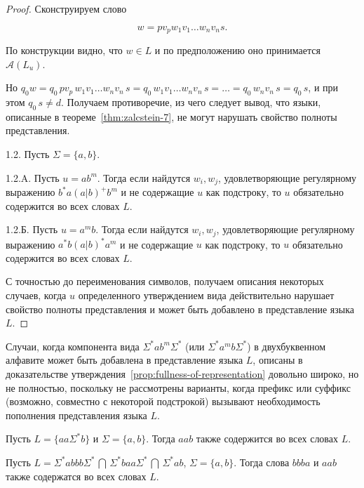 \documentclass[fontsize=14pt]{scrartcl}
\begin{document}
\begin{proof}
 Сконструируем слово 

 $$
 w = p v_p w_1 v_1 \ldots w_n v_n s.
 $$

 По конструкции видно, что $w \in L$ и по предположению оно принимается $\mathcal{A}(L_u)$.
 
 Но $q_0 w = q_0 \,p v_p \, w_1 v_1 \ldots w_n v_n\, s = q_0 \,w_1 v_1 \ldots w_n v_n\, s = \ldots  = q_0 \,w_n v_n \,s = q_0 \, s$,
и при этом $q_0\, s \neq d$. Получаем противоречие, из чего следует вывод, что языки, описанные в теореме~\ref{thm:zalcstein-7}, не могут 
нарушать свойство полноты представления.

1.2. Пусть $\Sigma = \{a, b\}$.

1.2.A. Пусть $u = a b^m$. Тогда если найдутся $w_i, w_j$, удовлетворяющие регулярному выражению
$b^*a(a|b)^+b^m$ и не содержащие $u$ как подстроку, то $u$ обязательно содержится во всех словах $L$.

1.2.Б. Пусть $u = a^m b$. Тогда если найдутся $w_i, w_j$, удовлетворяющие регулярному выражению
$a^*b(a|b)^*a^m$ и не содержащие $u$ как подстроку, то $u$ обязательно содержится во всех словах $L$.
 
С точностью до переименования символов, получаем описания некоторых случаев, когда $u$ определенного утверждением
вида действительно нарушает свойство полноты представления и может быть добавлено в представление языка $L$.

\end{proof}

Случаи, когда компонента вида $\Sigma^*a b^m \Sigma^*$ (или $\Sigma^*a^m b \Sigma^*$) в двухбуквенном алфавите
может быть добавлена в представление языка $L$, описаны в доказательстве утверждения~\ref{prop:fullness-of-representation} довольно
широко, но не полностью, поскольку не рассмотрены варианты, когда префикс или суффикс (возможно, совместно с некоторой подстрокой)
вызывают необходимость пополнения представления языка $L$.

\begin{Example}
Пусть $L = \{aa\Sigma^*b\}$ и $\Sigma = \{a, b\}$. Тогда $aab$ также содержится во всех словах $L$.
\end{Example}

\begin{Example}
Пусть $L = \Sigma^* abbb \Sigma^*\, \bigcap\, \Sigma^* baa \Sigma^*\, \bigcap\, \Sigma^* ab $, $\Sigma = \{a, b\}$.
Тогда слова $bbba$ и  $aab$ также содержатся во всех словах $L$.
\end{Example}
\end{document}
